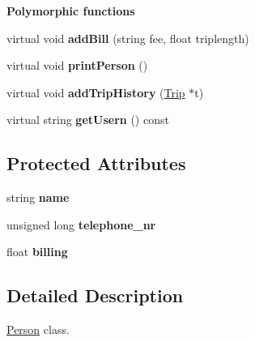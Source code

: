 \begin{Indent}{\bf Polymorphic functions}\par
\begin{DoxyCompactItemize}
\item 
\hypertarget{class_person_ab2e01c5852e65685b30c7f93af5a82e2}{virtual void {\bfseries add\+Bill} (string fee, float triplength)}\label{class_person_ab2e01c5852e65685b30c7f93af5a82e2}

\item 
\hypertarget{class_person_afe5e1da83f868d72cb9c49b371b066b4}{virtual void {\bfseries print\+Person} ()}\label{class_person_afe5e1da83f868d72cb9c49b371b066b4}

\item 
\hypertarget{class_person_a28b1defaeb5d84515f5c27674b2a3007}{virtual void {\bfseries add\+Trip\+History} (\hyperlink{class_trip}{Trip} $\ast$t)}\label{class_person_a28b1defaeb5d84515f5c27674b2a3007}

\item 
\hypertarget{class_person_a81e8251d01b54f58ae26e8dc18520eb1}{virtual string {\bfseries get\+Usern} () const }\label{class_person_a81e8251d01b54f58ae26e8dc18520eb1}

\end{DoxyCompactItemize}
\end{Indent}
\subsection*{Protected Attributes}
\begin{DoxyCompactItemize}
\item 
\hypertarget{class_person_a669b64897b4d823a27bb5866368d4dfa}{string {\bfseries name}}\label{class_person_a669b64897b4d823a27bb5866368d4dfa}

\item 
\hypertarget{class_person_a0118ba61947248bceca632314dc4ed64}{unsigned long {\bfseries telephone\+\_\+nr}}\label{class_person_a0118ba61947248bceca632314dc4ed64}

\item 
\hypertarget{class_person_ac9185a4fc1e41fc19b4a2059d000cb98}{float {\bfseries billing}}\label{class_person_ac9185a4fc1e41fc19b4a2059d000cb98}

\end{DoxyCompactItemize}


\subsection{Detailed Description}
\hyperlink{class_person}{Person} class. 

